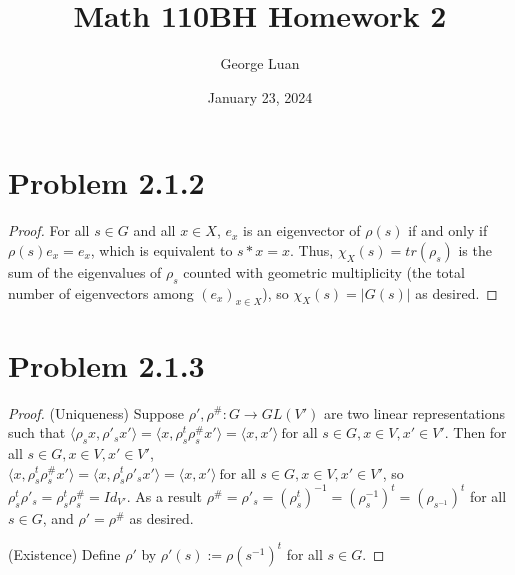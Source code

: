 \documentclass{article}
\title{Math 110BH Homework 2}
\author{George Luan}
\date{January 23, 2024} %
\begin{document}
\maketitle

\section*{Problem 2.1.2}
\begin{proof}
    For all $s\in G$ and all $x \in X$, $e_{x}$ is an eigenvector of $\rho(s)$ if and only if $\rho(s)e_{x} = e_{x}$, which is equivalent to $s*x = x$. Thus, $\chi_{X}(s) = tr(\rho_s)$ is the sum of the eigenvalues of $\rho_{s}$ counted with geometric multiplicity (the total number of eigenvectors among $(e_{x})_{x \in X}$), so $\chi_{X}(s) = |G(s)|$ as desired.  
\end{proof}

\section*{Problem 2.1.3}
\begin{proof}
(Uniqueness) Suppose $\rho', \rho^\#: G \to GL(V')$ are two linear representations such that $\langle \rho_s x, \rho'_s x'\rangle = \langle x, \rho_s^{t}\rho^\#_s x'\rangle = \langle x, x' \rangle \ \text{for all } s \in G, x \in V, x' \in V'$.
Then for all $s \in G, x \in V, x' \in V'$, $\langle x, \rho_s^{t}\rho^{\#}_s x'\rangle = \langle x, \rho_s^{t}\rho'_s x'\rangle = \langle x, x' \rangle \ \text{for all } s \in G, x \in V, x' \in V'$, so $\rho_s^{t}\rho'_s = \rho_s^{t}\rho^\#_s = Id_{V'}$. As a result $\rho^\# = \rho'_s = (\rho_s^{t})^{-1} = (\rho_s^{-1})^{t} = (\rho_{s^{-1}})^{t}$ for all $s \in G$, and $\rho' = \rho^\#$ as desired.

(Existence) Define $\rho'$ by $\rho'(s) := \rho(s^{-1})^t$ for all $s \in G$.
\end{proof}
\end{document}
